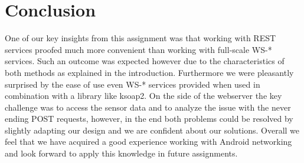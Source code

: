 \documentclass{report}
\begin{document}
\section{Conclusion}

One of our key insights from this assignment was that working with REST services proofed much more convenient than working with full-scale WS\hbox{-}* services. Such an outcome was expected however due to the characteristics of both methods as explained in the introduction. Furthermore we were pleasantly surprised by the ease of use even WS\hbox{-}* services provided when used in combination with a library like ksoap2\cite{ksoap2}. On the side of the webserver the key challenge was to access the sensor data and to analyze the issue with the never ending POST requests, however, in the end both problems could be resolved by slightly adapting our design and we are confident about our solutions. Overall we feel that we have acquired a good experience working with Android networking and look forward to apply this knowledge in future assignments.



\end{document}
